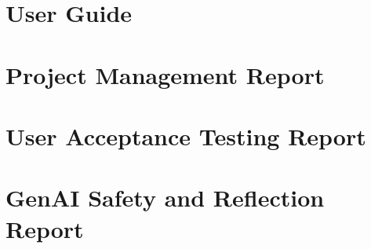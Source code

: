 \documentclass[fontsize=11pt,twoside=off]{scrbook}
\begin{document}


\tableofcontents
\clearpage

\listoffigures
\clearpage

\listoftables
\clearpage

\part{User Guide}


\part{Project Management Report}


\part{User Acceptance Testing Report}\label{part:uat}


\part{GenAI Safety and Reflection Report}\label{part:safety}


\cleardoublepage

\end{document}
